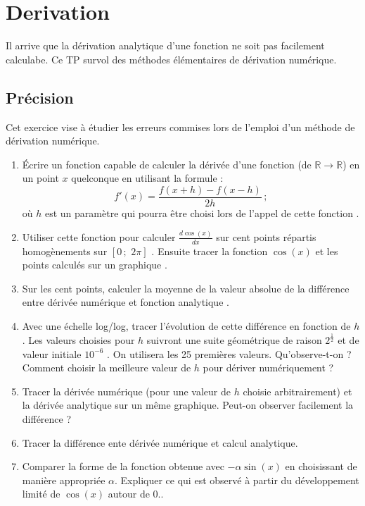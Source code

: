 \section{Derivation}
Il arrive que la dérivation analytique d'une fonction ne soit pas facilement
calculabe. Ce TP survol des méthodes élémentaires de dérivation numérique.
\subsection{Précision}
Cet exercice vise à étudier les erreurs commises lors de l'emploi
d'un méthode de dérivation numérique.
\begin{enumerate}
\item Écrire un fonction capable de calculer la dérivée 
d'une fonction (de $\mathbb{R}  \longrightarrow  \mathbb{R}$)  en 
un point $x$ quelconque en utilisant la formule : 
$$f'(x)= \frac{f(x+h)-f(x-h)}{2h}\,;$$
où $h$ est un paramètre qui pourra être choisi lors de l'appel de cette fonction
.
\item Utiliser cette fonction pour calculer $\frac{d\cos(x)}{dx}$ 
sur cent points répartis homogènements sur $[0\,;\,\,2\pi]$
.
Ensuite tracer la fonction $\cos(x)$ et les points calculés sur
un graphique
.
\item Sur les cent points, calculer la moyenne de la valeur
 absolue de la différence entre dérivée numérique et fonction analytique
.
\item Avec une échelle log/log, tracer l'évolution de cette différence 
en fonction de $h$. Les valeurs choisies pour $h$ suivront une suite 
géométrique de raison $2^\frac{1}{2}$ et de valeur initiale $10^{-6}$ . 
On utilisera les 25 premières valeurs.
Qu'observe-t-on ? 
Comment choisir la meilleure valeur de $h$ pour dériver numériquement ? 
\item Tracer la dérivée numérique (pour une valeur de $h$ choisie arbitrairement)
 et la dérivée 
analytique sur un même graphique. Peut-on observer facilement la différence ? 
\item Tracer la différence ente dérivée numérique et calcul analytique. 
\item Comparer la forme de la fonction obtenue avec 
$-\alpha \sin(x)$ en choisissant de manière appropriée $\alpha$.
Expliquer ce qui est observé à partir du développement limité de $\cos(x)$ 
autour de $0$.. 
\end{enumerate}

